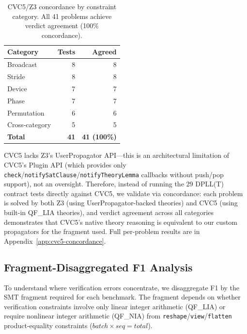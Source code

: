 \documentclass[11pt]{article}
\begin{document}
\begin{table}[h]
\centering
\caption{CVC5/Z3 concordance by constraint category.  All 41 problems
  achieve verdict agreement (100\% concordance).}
\label{tab:cvc5-comprehensive}
\small
\begin{tabular}{@{}lrr@{}}
\toprule
\textbf{Category} & \textbf{Tests} & \textbf{Agreed} \\
\midrule
Broadcast       & 8 & 8 \\
Stride          & 8 & 8 \\
Device          & 7 & 7 \\
Phase           & 7 & 7 \\
Permutation     & 6 & 6 \\
Cross-category  & 5 & 5 \\
\midrule
\textbf{Total}  & \textbf{41} & \textbf{41 (100\%)} \\
\bottomrule
\end{tabular}
\end{table}

CVC5 lacks Z3's UserPropagator API---this is an architectural
limitation of CVC5's Plugin API (which provides only
\texttt{check}/\texttt{notifySatClause}/\texttt{notifyTheoryLemma}
callbacks without push/pop support), not an oversight.  Therefore,
instead of running the 29 DPLL(T) contract tests directly against
CVC5, we validate via concordance: each problem is solved by both Z3
(using UserPropagator-backed theories) and CVC5 (using built-in QF\_LIA
theories), and verdict agreement across all categories demonstrates
that CVC5's native theory reasoning is equivalent to our custom
propagators for the fragment used.  Full per-problem results are in
Appendix~\ref{app:cvc5-concordance}.


\subsection{Fragment-Disaggregated F1 Analysis}\label{sec:fragment-f1}

To understand where verification errors concentrate, we disaggregate
F1 by the SMT fragment required for each benchmark.  The fragment
depends on whether verification constraints involve only linear
integer arithmetic (QF\_LIA) or require nonlinear integer arithmetic
(QF\_NIA) from \texttt{reshape}/\texttt{view}/\texttt{flatten}
product-equality constraints ($\mathit{batch} \times \mathit{seq} = \mathit{total}$).
\end{document}
